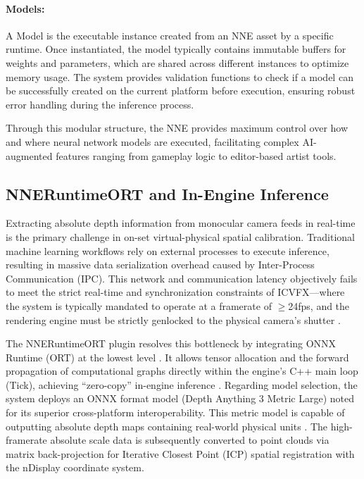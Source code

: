 \documentclass[12pt,a4paper]{report}
\begin{document}
\paragraph{Models:} A Model is the executable instance created from an NNE asset by a specific runtime. Once instantiated, the model typically contains immutable buffers for weights and parameters, which are shared across different instances to optimize memory usage. The system provides validation functions to check if a model can be successfully created on the current platform before execution, ensuring robust error handling during the inference process.

Through this modular structure, the NNE provides maximum control over how and where neural network models are executed, facilitating complex AI-augmented features ranging from gameplay logic to editor-based artist tools.

\subsection{NNERuntimeORT and In-Engine Inference}
Extracting absolute depth information from monocular camera feeds in real-time is the primary challenge in on-set virtual-physical spatial calibration. Traditional machine learning workflows rely on external processes to execute inference, resulting in massive data serialization overhead caused by Inter-Process Communication (IPC). This network and communication latency objectively fails to meet the strict real-time and synchronization constraints of ICVFX---where the system is typically mandated to operate at a framerate of $\geq$24fps, and the rendering engine must be strictly genlocked to the physical camera's shutter \cite{epic2024icvfx}.

The NNERuntimeORT plugin resolves this bottleneck by integrating ONNX Runtime (ORT) at the lowest level \cite{epic2024nne}. It allows tensor allocation and the forward propagation of computational graphs directly within the engine's C++ main loop (Tick), achieving ``zero-copy'' in-engine inference \cite{microsoft2024onnx}. Regarding model selection, the system deploys an ONNX format model (Depth Anything 3 Metric Large) noted for its superior cross-platform interoperability. This metric model is capable of outputting absolute depth maps containing real-world physical units \cite{yang2024depth}. The high-framerate absolute scale data is subsequently converted to point clouds via matrix back-projection for Iterative Closest Point (ICP) spatial registration with the nDisplay coordinate system.
\end{document}
